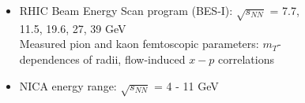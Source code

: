 \documentclass[dvipsnames] {beamer}
\begin{document}
\begin{frame}
{\begin{columns}[t]
\begin{block}{}
                         \begin{itemize}
                         \item {\color{blue} RHIC Beam Energy Scan program (BES-I):} $\sqrt{s_{NN}}$ = 7.7, 11.5, 19.6, 27, 39 GeV \\
                           Measured pion and kaon femtoscopic parameters: $m_{T}$-dependences of radii, flow-induced $x-p$ correlations
                         \item {\color{ForestGreen} NICA energy range:} $\sqrt{s_{NN}}$ = 4 - 11 GeV
                         \end{itemize}
                       \end{block}
                       \begin{block}{\bf {}}
                         \begin{figure}[H]

\end{figure}
\end{block}
\end{columns}}
\end{frame}
\end{document}
